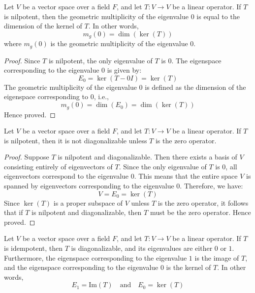 \documentclass[openany]{book}
\begin{document}
\begin{corollary}
    Let $V$ be a vector space over a field $F$, and let $T: V \to V$ be a linear operator. If $T$ is nilpotent, then the geometric multiplicity of the eigenvalue $0$ is equal to the dimension of the kernel of $T$. In other words,
    $$m_g(0) = \dim(\ker(T))$$
    where $m_g(0)$ is the geometric multiplicity of the eigenvalue $0$.
\end{corollary}
\begin{proof}
    Since $T$ is nilpotent, the only eigenvalue of $T$ is $0$. The eigenspace corresponding to the eigenvalue $0$ is given by:
    $$E_0 = \ker(T - 0I) = \ker(T)$$
    The geometric multiplicity of the eigenvalue $0$ is defined as the dimension of the eigenspace corresponding to $0$, i.e.,
    $$m_g(0) = \dim(E_0) = \dim(\ker(T))$$
    Hence proved.
\end{proof}
\begin{corollary}
    Let $V$ be a vector space over a field $F$, and let $T: V \to V$ be a linear operator. If $T$ is nilpotent, then it is not diagonalizable unless $T$ is the zero operator.
\end{corollary}
\begin{proof}
    Suppose $T$ is nilpotent and diagonalizable. Then there exists a basis of $V$ consisting entirely of eigenvectors of $T$. Since the only eigenvalue of $T$ is $0$, all eigenvectors correspond to the eigenvalue $0$. This means that the entire space $V$ is spanned by eigenvectors corresponding to the eigenvalue $0$. Therefore, we have:
    $$V = E_0 = \ker(T)$$
    Since $\ker(T)$ is a proper subspace of $V$ unless $T$ is the zero operator, it follows that if $T$ is nilpotent and diagonalizable, then $T$ must be the zero operator. Hence proved.
\end{proof}
\begin{mytheorem}
    Let $V$ be a vector space over a field $F$, and let $T: V \to V$ be a linear operator. If $T$ is idempotent, then $T$ is diagonalizable, and its eigenvalues are either $0$ or $1$. Furthermore, the eigenspace corresponding to the eigenvalue $1$ is the image of $T$, and the eigenspace corresponding to the eigenvalue $0$ is the kernel of $T$. In other words,
    $$E_1 = \text{Im}(T) \quad \text{and} \quad E_0 = \ker(T)$$
\end{mytheorem}
\end{document}

